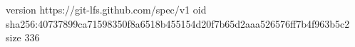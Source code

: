 version https://git-lfs.github.com/spec/v1
oid sha256:40737899ca71598350f8a6518b455154d20f7b65d2aaa526576ff7b4f963b5c2
size 336
